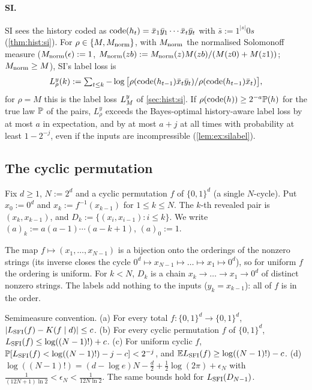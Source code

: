 \paragraph{SI.} SI sees the history coded as $\operatorname{code}(h_t)=\bar x_1\bar y_1\cdots\bar x_t\bar y_t$ with $\bar s:=1^{|s|}0s$ (\cref{thm:hist:si}). For $\rho\in\{M,M_{\mathrm{norm}}\}$, with $M_{\mathrm{norm}}$ the normalised Solomonoff measure ($M_{\mathrm{norm}}(\epsilon):=1$, $M_{\mathrm{norm}}(zb):=M_{\mathrm{norm}}(z)M(zb)/(M(z0)+M(z1))$; $M_{\mathrm{norm}}\ge M$), SI's label loss is
\[\textstyle L^y_\rho(k):=\sum_{t\le k}-\log\big[\rho(\operatorname{code}(h_{t-1})\bar x_t\bar y_t)/\rho(\operatorname{code}(h_{t-1})\bar x_t)\big],\]
for $\rho=M$ this is the label loss $L_{M}^{y}$ of \cref{sec:hist:si}. If $\rho(\operatorname{code}(h))\ge2^{-a}\mathbb{P}(h)$ for the true law $\mathbb{P}$ of the pairs, $L^y_\rho$ exceeds the Bayes-optimal history-aware label loss by at most $a$ in expectation, and by at most $a+j$ at all times with probability at least $1-2^{-j}$, even if the inputs are incompressible (\cref{lem:ex:silabel}).

\subsection{The cyclic permutation}\label{sec:ex:cyclic}

\begin{definition}\label{def:ex:cyclic}
Fix $d\ge1$, $N:=2^d$ and a cyclic permutation $f$ of $\{0,1\}^d$ (a single $N$-cycle). Put $x_0:=0^d$ and $x_k:=f^{-1}(x_{k-1})$ for $1\le k\le N$. The $k$-th revealed pair is $(x_k,x_{k-1})$, and $D_k:=\{(x_i,x_{i-1}):i\le k\}$. We write $(a)_k:=a(a-1)\cdots(a-k+1)$, $(a)_0:=1$.
\end{definition}

The map $f\mapsto(x_1,\dots,x_{N-1})$ is a bijection onto the orderings of the nonzero strings (its inverse closes the cycle $0^d\mapsto x_{N-1}\mapsto\dots\mapsto x_1\mapsto0^d$), so for uniform $f$ the ordering is uniform. For $k<N$, $D_k$ is a chain $x_k\to\dots\to x_1\to0^d$ of distinct nonzero strings. The labels add nothing to the inputs ($y_k=x_{k-1}$): all of $f$ is in the order.

\begin{theorem}\label{thm:ex:cycle}
Semimeasure convention.
(a) For every total $f:\{0,1\}^d\to\{0,1\}^d$, $|L_{\mathrm{SFI}}(f)-K(f\mid d)|\le c$.
(b) For every cyclic permutation $f$ of $\{0,1\}^d$, $L_{\mathrm{SFI}}(f)\le\log((N-1)!)+c$.
(c) For uniform cyclic $f$, $\mathbb{P}[L_{\mathrm{SFI}}(f)<\log((N-1)!)-j-c]<2^{-j}$, and $\mathbb{E}L_{\mathrm{SFI}}(f)\ge\log((N-1)!)-c$.
(d) $\log((N-1)!)=(d-\log e)N-\frac d2+\frac12\log(2\pi)+\epsilon_N$ with $\frac1{(12N+1)\ln2}<\epsilon_N<\frac1{12N\ln2}$.
The same bounds hold for $L_{\mathrm{SFI}}(D_{N-1})$.
\end{theorem}

